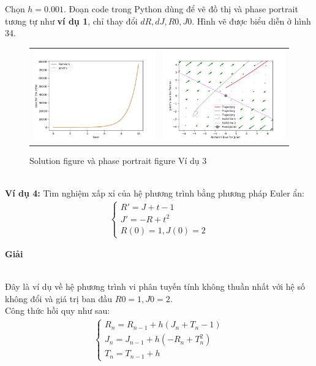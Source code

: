 Chọn $h=0.001$. Đoạn code trong Python dùng để vẽ đồ thị và phase portrait tương tự như \textbf{ví dụ 1}, chỉ thay đổi $dR, dJ, R0, J0$. Hình vẽ được biểu diễn ở hình 34.
\begin{figure}[h!]
    \begin{center}
        \begin{tabular}{cc}
             \includegraphics[width=7cm]{images/euler_3.png} &
             \includegraphics[width=7cm]{images/euler_3_portrait.png}\\
        \end{tabular}
        \caption{Solution figure và phase portrait figure Ví dụ 3}
    \end{center}
\end{figure}\\
\textbf{Ví dụ 4:}  Tìm nghiệm xấp xỉ của hệ phương trình bằng phương pháp Euler ẩn:
\begin{align*}
    \begin{cases}
        R'=J+t-1\\
        J'=-R+t^2\\
        R(0)=1, J(0)=2
    \end{cases}
\end{align*}
\centerline{\textbf{Giải}}\\
Đây là ví dụ về hệ phương trình vi phân tuyến tính không thuần nhất với hệ số không đổi và giá trị ban đầu $R0 = 1, J0 = 2$.\\
Công thức hồi quy như sau:
\begin{align*}
    \begin{cases}
        R_n=R_{n-1}+h(J_n + T_n - 1)\\
        J_n=J_{n-1}+h(-R_n + T_n^2)\\
        T_n=T_{n-1}+h
    \end{cases}
\end{align*}
